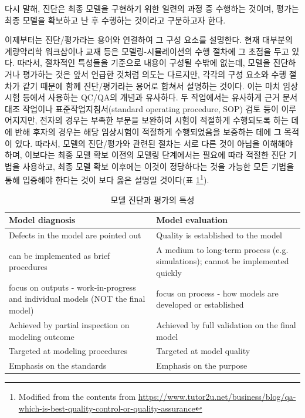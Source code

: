 \documentclass[
  10pt,
  krantz2,
  a4paper]{krantz}
\theoremstyle{definition}
\theoremstyle{definition}
\theoremstyle{definition}
\theoremstyle{remark}
\begin{document}
다시 말해, 진단은 최종 모델을 구현하기 위한 일련의 과정 중 수행하는 것이며, 평가는 최종 모델을 확보하고 난 후 수행하는 것이라고 구분하고자 한다.

이제부터는 진단/평가라는 용어와 연결하여 그 구성 요소를 설명한다. 현재 대부분의 계량약리학 워크샵이나 교재 등은 모델링-시뮬레이션의 수행 절차에 그 초점을 두고 있다. 따라서, 절차적인 특성들을 기준으로 내용이 구성될 수밖에 없는데, 모델을 진단하거나 평가하는 것은 앞서 언급한 것처럼 의도는 다르지만, 각각의 구성 요소와 수행 절차가 같기 때문에 함께 진단/평가라는 용어로 합쳐서 설명하는 것이다. 이는 마치 임상시험 등에서 사용하는 QC/QA의 개념과 유사하다. 두 작업에서는 유사하게 근거 문서 대조 작업이나 표준작업지침서(standard operating procedure, SOP) 검토 등이 이루어지지만, 전자의 경우는 부족한 부분을 보완하여 시험이 적절하게 수행되도록 하는 데에 반해 후자의 경우는 해당 임상시험이 적절하게 수행되었음을 보증하는 데에 그 목적이 있다. 따라서, 모델의 진단/평가와 관련된 절차는 서로 다른 것이 아님을 이해해야 하며, 이보다는 최종 모델 확보 이전의 모델링 단계에서는 필요에 따라 적절한 진단 기법을 사용하고, 최종 모델 확보 이후에는 이것이 정당하다는 것을 가능한 모든 기법을 통해 입증해야 한다는 것이 보다 옳은 설명일 것이다(표 \ref{tab:diag-eval-property}\footnote{Modified from the contents from \url{https://www.tutor2u.net/business/blog/qa-which-is-best-quality-control-or-quality-assurance}}).


\begin{table}

\caption{\label{tab:diag-eval-property}모델 진단과 평가의 특성}
\centering
\begin{tabular}[t]{>{\raggedright\arraybackslash}p{7cm}>{\raggedright\arraybackslash}p{7cm}}
\toprule
Model diagnosis & Model evaluation\\
\midrule
Defects in the model are pointed out & Quality is established to the model\\
can be implemented as brief procedures & A medium to long-term process (e.g. simulations); cannot be implemented quickly\\
focus on outputs - work-in-progress and individual models (NOT the final model) & focus on process - how models are developed or established\\
Achieved by partial inspection on modeling outcome & Achieved by full validation on the final model\\
Targeted at modeling procedures & Targeted at model quality\\
\addlinespace
Emphasis on the standards & Emphasis on the purpose\\
\bottomrule
\end{tabular}
\end{table}
\end{document}
